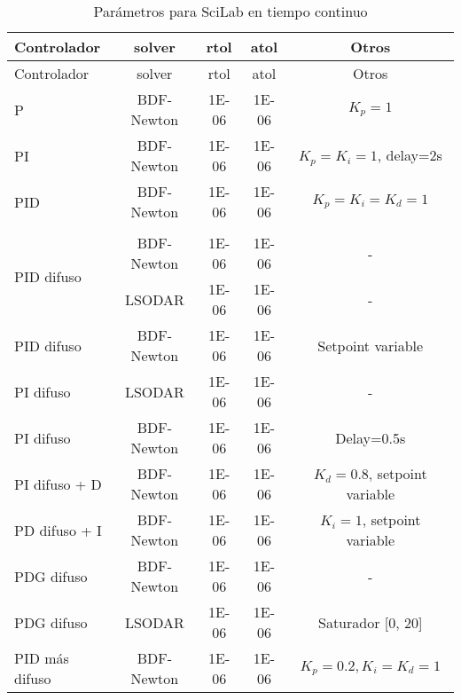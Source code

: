         {\setlength\LTleft{0pt}
        \setlength\LTright{0pt}
        \centering
        \footnotesize
        \renewcommand{\arraystretch}{0.89}
        \begin{longtable}{l @{\extracolsep{\fill}} cccc}
            \caption[Parámetros para SciLab en tiempo continuo]{Parámetros para SciLab en tiempo continuo} 
            \label{tab:parametrosSciLabc} \\
            \toprule
            Controlador  & solver & rtol & atol & Otros       \\ \midrule
            \endfirsthead
            \toprule
            Controlador  & solver & rtol & atol & Otros       \\ \midrule
            \endhead
            \bottomrule
            \endfoot
            P                          & BDF-Newton & \num{1E-06} & \num{1E-06} & $K_p=1$                       \\
            PI                         & BDF-Newton & \num{1E-06} & \num{1E-06} & $K_p=K_i=1$, delay=2s         \\
            PID                        & BDF-Newton & \num{1E-06} & \num{1E-06} & $K_p=K_i=K_d=1$               \\
                                        &            &             &             &                               \\[-3pt]        
            \multirow{2}{*}{PID difuso}& BDF-Newton & \num{1E-06} & \num{1E-06} & -                             \\
                                        & LSODAR     & \num{1E-06} & \num{1E-06} & -                             \\
            PID difuso                 & BDF-Newton & \num{1E-06} & \num{1E-06} & Setpoint variable             \\
            PI difuso                  & LSODAR     & \num{1E-06} & \num{1E-06} & -                             \\
            PI difuso                  & BDF-Newton & \num{1E-06} & \num{1E-06} & Delay=0.5s                    \\
            PI difuso + D              & BDF-Newton & \num{1E-06} & \num{1E-06} & $K_d=0.8$, setpoint variable  \\
            PD difuso + I              & BDF-Newton & \num{1E-06} & \num{1E-06} & $K_i=1$, setpoint variable    \\
            PDG difuso                 & BDF-Newton & \num{1E-06} & \num{1E-06} & -                             \\
            PDG difuso                 & LSODAR     & \num{1E-06} & \num{1E-06} & Saturador [0, 20]             \\
            PID más difuso             & BDF-Newton & \num{1E-06} & \num{1E-06} & $K_p=0.2, K_i=K_d=1$          \\
        \end{longtable}}

